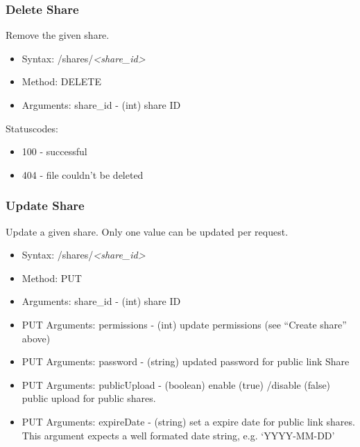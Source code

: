 \documentclass[letterpaper,10pt,english]{sphinxmanual}
\begin{document}
\subsubsection{Delete Share}
\label{core/ocs-share-api:delete-share}
Remove the given share.
\begin{itemize}
\item {} 
Syntax: /shares/\emph{\textless{}share\_id\textgreater{}}

\item {} 
Method: DELETE

\item {} 
Arguments: share\_id - (int) share ID

\end{itemize}

Statuscodes:
\begin{itemize}
\item {} 
100 - successful

\item {} 
404 - file couldn't be deleted

\end{itemize}


\subsubsection{Update Share}
\label{core/ocs-share-api:update-share}
Update a given share. Only one value can be updated per request.
\begin{itemize}
\item {} 
Syntax: /shares/\emph{\textless{}share\_id\textgreater{}}

\item {} 
Method: PUT

\item {} 
Arguments: share\_id - (int) share ID

\item {} 
PUT Arguments: permissions - (int) update permissions (see ``Create share''
above)

\item {} 
PUT Arguments: password - (string) updated password for public link Share

\item {} 
PUT Arguments: publicUpload - (boolean) enable (true) /disable (false) public
upload for public shares.

\item {} 
PUT Arguments: expireDate - (string) set a expire date for public link
shares. This argument expects a well formated date string, e.g. `YYYY-MM-DD'

\end{itemize}
\end{document}
